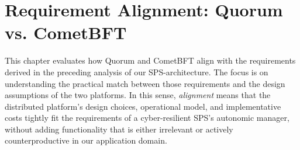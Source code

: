 

\chapter{Requirement Alignment: Quorum vs. CometBFT}
\label{chap:requirements}
\label{sec:comparison}

This chapter evaluates how Quorum and CometBFT align with the requirements derived in the preceding analysis of our SPS-architecture. The focus is on understanding the practical match between those requirements and the design assumptions of the two platforms. In this sense, \emph{alignment} means that the distributed platform's design choices, operational model, and implementative costs tightly fit the requirements of a cyber-resilient SPS's autonomic manager, without adding functionality that is either irrelevant or actively counterproductive in our application domain.

